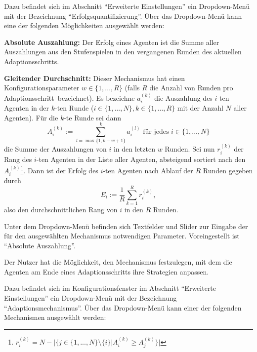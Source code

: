 \documentclass[parskip=full,11pt]{scrartcl}
\def\adapt{Adaptionsschritt}
\begin{document}
Dazu befindet sich im Abschnitt \enquote{Erweiterte Einstellungen} ein Dropdown-Menü mit der Bezeichnung \enquote{Erfolgsquantifizierung}. Über das Dropdown-Menü kann eine der folgenden Möglichkeiten ausgewählt werden:

\textbf{Absolute Auszahlung:}
Der Erfolg eines Agenten ist die Summe aller Auszahlungen aus den Stufenspielen in den vergangenen Runden des aktuellen \adapt s.

\textbf{Gleitender Durchschnitt:}
Dieser Mechanismus hat einen Konfigurationsparameter \(w \in \{1,...,R\}\) (falls \(R\) die Anzahl von Runden pro \adapt\ bezeichnet). Es bezeichne \(a_i^{(k)}\) die Auszahlung des \(i\)-ten Agenten in der \(k\)-ten Runde (\(i \in \{1,...,N\}, k \in \{1,...,R\}\) mit der Anzahl \(N\) aller Agenten). Für die \(k\)-te Runde sei dann
\[
A_i^{(k)} := \sum_{l = \max\{1,k-w+1\}}^k a_i^{(l)} \text{  für jedes  } i \in \{1,...,N\}
\]
die Summe der Auszahlungen von \(i\) in den letzten \(w\) Runden. Sei nun \(r_i^{(k)}\) der Rang des \(i\)-ten Agenten in der Liste aller Agenten, absteigend sortiert nach den \(A_i^{(k)}\)\footnote{\(r_i^{(k)} = N - |\{j \in \{1,...,N\} \setminus \{i\} | A_i^{(k)} \geq A_j^{(k)}\}|\)}. Dann ist der Erfolg des \(i\)-ten Agenten nach Ablauf der \(R\) Runden gegeben durch
\[
E_i := \frac 1R \sum_{k=1}^R r_i^{(k)},
\]
also den durchschnittlichen Rang von \(i\) in den \(R\) Runden.

Unter dem Dropdown-Menü befinden sich Textfelder und Slider zur Eingabe der für den ausgewählten Mechanismus notwendigen Parameter. Voreingestellt ist \enquote{Absolute Auszahlung}. 

Der Nutzer hat die Möglichkeit, den Mechanismus festzulegen, mit dem die Agenten am Ende eines \adapt s ihre Strategien anpassen.

Dazu befindet sich im Konfigurationsfenster im Abschnitt \enquote{Erweiterte Einstellungen} ein Dropdown-Menü mit der Bezeichnung \enquote{Adaptionsmechanismus}. Über das Dropdown-Menü kann einer der folgenden Mechanismen ausgewählt werden:
\end{document}
